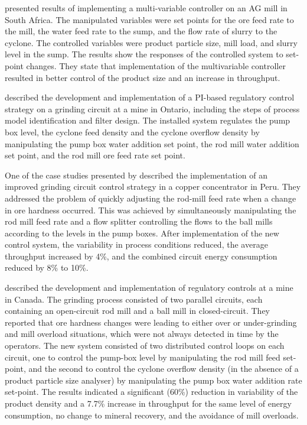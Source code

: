\cite{hulbert_multivariable_1990} presented results of implementing a multi-variable controller on an AG mill in South Africa. The manipulated variables were set points for the ore feed rate to the mill, the water feed rate to the sump, and the flow rate of slurry to the cyclone. The controlled variables were product particle size, mill load, and slurry level in the sump. The results show the responses of the controlled system to set-point changes. They state that implementation of the multivariable controller resulted in better control of the product size and an increase in throughput.

\cite{desbiens_distributed_1997} described the development and implementation of a \gls{PI}-based regulatory control strategy on a grinding circuit at a mine in Ontario, including the steps of process model identification and filter design. The installed system regulates the pump box level, the cyclone feed density and the cyclone overflow density by manipulating the pump box water addition set point, the rod mill water addition set point, and the rod mill ore feed rate set point.

One of the case studies presented by \cite{desbiens_using_2008} described the implementation of an improved grinding circuit control strategy in a copper concentrator in Peru. They addressed the problem of quickly adjusting the rod-mill feed rate when a change in ore hardness occurred. This was achieved by simultaneously manipulating the rod mill feed rate and a flow splitter controlling the flows to the ball mills according to the levels in the pump boxes. After implementation of the new control system, the variability in process conditions reduced, the average throughput increased by 4\%, and the combined circuit energy consumption reduced by 8\% to 10\%.

\cite{nunez_self-optimizing_2009} described the development and implementation of regulatory controls at a mine in Canada. The grinding process consisted of two parallel circuits, each containing an open-circuit rod mill and a ball mill in closed-circuit. They reported that ore hardness changes were leading to either over or under-grinding and mill overload situations, which were not always detected in time by the operators. The new system consisted of two distributed control loops on each circuit, one to control the pump-box level by manipulating the rod mill feed set-point, and the second to control the cyclone overflow density (in the absence of a product particle size analyser) by manipulating the pump box water addition rate set-point. The results indicated a significant (60\%) reduction in variability of the product density and a 7.7\% increase in throughput for the same level of energy consumption, no change to mineral recovery, and the avoidance of mill overloads.

